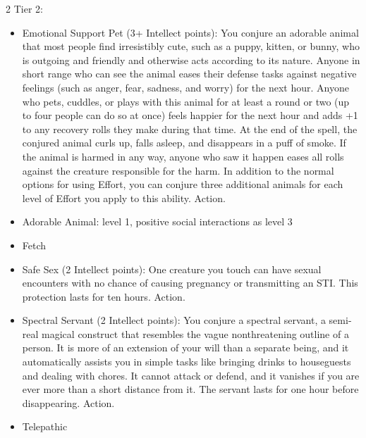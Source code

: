 \begin{multicols}{2}
Tier 2:
\begin{itemize}
\item Emotional Support Pet (3+ Intellect points): You conjure an adorable animal that most people find irresistibly cute, such as a puppy, kitten, or bunny, who is outgoing and friendly and otherwise acts according to its nature. Anyone in short range who can see the animal eases their defense tasks against negative feelings (such as anger, fear, sadness, and worry) for the next hour. Anyone who pets, cuddles, or plays with this animal for at least a round or two (up to four people can do so at once) feels happier for the next hour and adds +1 to any recovery rolls they make during that time. At the end of the spell, the conjured animal curls up, falls asleep, and disappears in a puff of smoke. If the animal is harmed in any way, anyone who saw it happen eases all rolls against the creature responsible for the harm. In addition to the normal options for using Effort, you can conjure three additional animals for each level of Effort you apply to this ability. Action. 
\item Adorable Animal: level 1, positive social interactions as level 3
\item Fetch 
\item Safe Sex (2 Intellect points): One creature you touch can have sexual encounters with no chance of causing pregnancy or transmitting an STI. This protection lasts for ten hours. Action.
\item Spectral Servant (2 Intellect points): You conjure a spectral servant, a semi-real magical construct that resembles the vague nonthreatening outline of a person. It is more of an extension of your will than a separate being, and it automatically assists you in simple tasks like bringing drinks to houseguests and dealing with chores. It cannot attack or defend, and it vanishes if you are ever more than a short distance from it. The servant lasts for one hour before disappearing. Action. 
\item Telepathic
\end{itemize}


\end{multicols}

